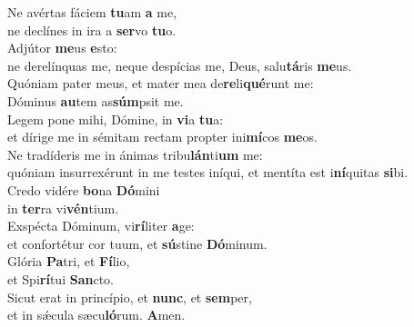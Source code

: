 \evenverse Ne avértas fáciem \textbf{tu}am \textbf{a} me,~\*\\
\evenverse ne declínes in ira a \textbf{ser}vo \textbf{tu}o.\\
\oddverse Adjútor \textbf{me}us \textbf{e}sto:~\*\\
\oddverse ne derelínquas me, neque despícias me, Deus, salu\textbf{tá}ris \textbf{me}us.\\
\evenverse Quóniam pater meus, et mater mea de\textbf{re}li\textbf{qué}runt me:~\*\\
\evenverse Dóminus \textbf{au}tem as\textbf{súm}psit me.\\
\oddverse Legem pone mihi, Dómine, in \textbf{vi}a \textbf{tu}a:~\*\\
\oddverse et dírige me in sémitam rectam propter ini\textbf{mí}cos \textbf{me}os.\\
\evenverse Ne tradíderis me in ánimas tribu\textbf{lán}ti\textbf{um} me:~\*\\
\evenverse quóniam insurrexérunt in me testes iníqui, et mentíta est i\textbf{ní}quitas \textbf{si}bi.\\
\oddverse Credo vidére \textbf{bo}na \textbf{Dó}mini~\*\\
\oddverse in \textbf{ter}ra vi\textbf{vén}tium.\\
\evenverse Exspécta Dóminum, vi\textbf{rí}liter \textbf{a}ge:~\*\\
\evenverse et confortétur cor tuum, et \textbf{sú}stine \textbf{Dó}minum.\\
\oddverse Glória \textbf{Pa}tri, et \textbf{Fí}lio,~\*\\
\oddverse et Spi\textbf{rí}tui \textbf{San}cto.\\
\evenverse Sicut erat in princípio, et \textbf{nunc}, et \textbf{sem}per,~\*\\
\evenverse et in sǽcula sæcu\textbf{ló}rum. \textbf{A}men.\\
